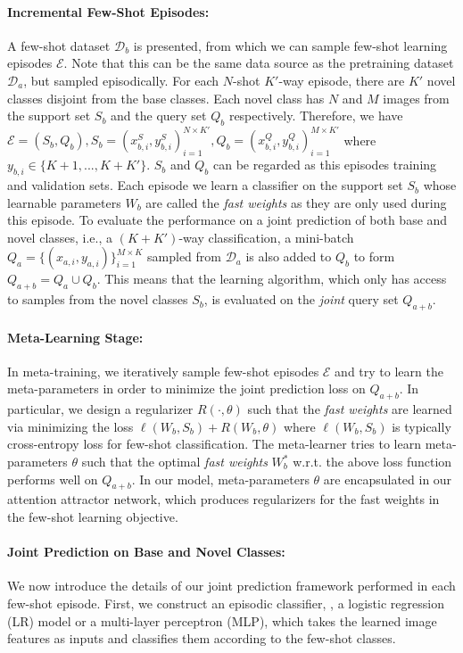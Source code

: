 \paragraph{Incremental Few-Shot Episodes:} A few-shot dataset $\mathcal{D}_b$ is presented, from
which we can sample few-shot learning episodes $\mathcal{E}$. Note that this can be the same data
source as the pretraining dataset $\mathcal{D}_a$, but sampled episodically. For each $N$-shot
$K'$-way episode, there are $K'$ novel classes disjoint from the base classes. Each novel class has
$N$ and $M$ images from the support set $S_b$ and the query set $Q_b$ respectively. Therefore, we
have $\mathcal{E} = (S_b, Q_b), S_b = (x_{b,i}^S, y_{b,i}^S)_{i=1}^{N \times K'}, Q_b = (x_{b,i}^Q,
y_{b,i}^Q)_{i=1}^{M
\times K'}$ where $y_{b,i} \in \{K+1,...,K+K'\}$. $S_b$ and $Q_b$ can be regarded as this episodes
training and validation sets. Each episode we learn a classifier on the support set $S_b$ whose
learnable parameters $W_b$ are called the \textit{fast weights} as they are only used during this
episode. To evaluate the performance on a joint prediction of both base and novel classes, i.e., a
$(K+K')$-way classification, a mini-batch $Q_a=\{(x_{a,i}, y_{a,i})\}_{i=1}^{M \times K}$ sampled
from $\mathcal{D}_a$ is also added to $Q_b$ to form $Q_{a+b} = Q_a \cup Q_b$. This means that the
learning algorithm, which only has access to samples from the novel classes $S_b$, is evaluated on
the \emph{joint} query set $Q_{a+b}$.
\paragraph{Meta-Learning Stage:} In meta-training, we iteratively sample few-shot episodes
$\mathcal{E}$ and try to learn the meta-parameters in order to minimize the joint prediction loss on
$Q_{a+b}$. In particular, we design a regularizer $R(\cdot, \theta)$ such that the \textit{fast
weights} are learned via minimizing the loss $\ell(W_b,S_b)+R(W_b, \theta)$ where $\ell(W_b,S_b)$ is
typically cross-entropy loss for few-shot classification. The meta-learner tries to learn
meta-parameters $\theta$ such that the optimal \textit{fast weights} $W_b^*$ w.r.t. the above loss
function performs well on $Q_{a+b}$. In our model, meta-parameters $\theta$ are encapsulated in our
attention attractor network, which produces regularizers for the fast weights in the few-shot
learning objective.

\paragraph{Joint Prediction on Base and Novel Classes:} We now introduce the details of our joint
prediction framework performed in each few-shot episode. First, we construct an episodic classifier,
\eg, a logistic regression (LR) model or a multi-layer perceptron (MLP), which takes the learned
image features as inputs and classifies them according to the few-shot classes.

